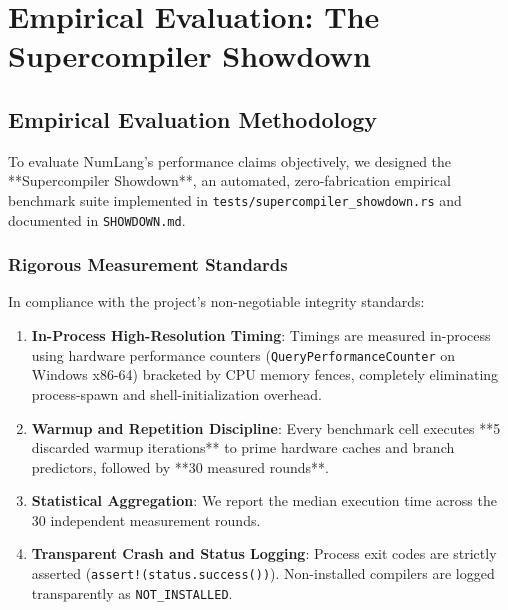 \chapter{Empirical Evaluation: The Supercompiler Showdown}
\label{chap:evaluation}

\section{Empirical Evaluation Methodology}
\label{sec:eval:methodology}

To evaluate NumLang's performance claims objectively, we designed the **Supercompiler Showdown**, an automated, zero-fabrication empirical benchmark suite implemented in \texttt{tests/supercompiler\_showdown.rs} and documented in \texttt{SHOWDOWN.md}.

\subsection{Rigorous Measurement Standards}
In compliance with the project's non-negotiable integrity standards:
\begin{enumerate}
    \item \textbf{In-Process High-Resolution Timing}: Timings are measured in-process using hardware performance counters (\texttt{QueryPerformanceCounter} on Windows x86-64) bracketed by CPU memory fences, completely eliminating process-spawn and shell-initialization overhead.
    \item \textbf{Warmup and Repetition Discipline}: Every benchmark cell executes **5 discarded warmup iterations** to prime hardware caches and branch predictors, followed by **30 measured rounds**.
    \item \textbf{Statistical Aggregation}: We report the median execution time across the 30 independent measurement rounds.
    \item \textbf{Transparent Crash and Status Logging}: Process exit codes are strictly asserted (\texttt{assert!(status.success())}). Non-installed compilers are logged transparently as \texttt{NOT\_INSTALLED}.
\end{enumerate}

